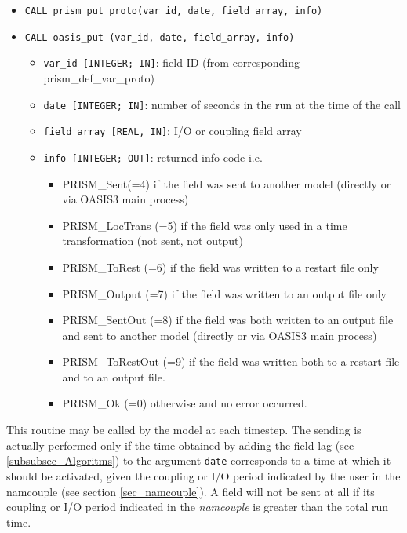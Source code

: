 \begin{itemize} 
 
\item {\tt CALL prism\_put\_proto(var\_id, date, field\_array, info)}
\item {\tt CALL oasis\_put       (var\_id, date, field\_array, info)}
\begin{itemize}
\item {\tt var\_id [INTEGER; IN]}: field ID (from
  corresponding prism\_def\_var\_proto)
\item {\tt date [INTEGER; IN]}: number of seconds in the run at the
time of the call
\item {\tt field\_array [REAL, IN]}: I/O or coupling field array 
\item {\tt info [INTEGER; OUT]}: returned info code i.e.
   \begin{itemize} 
      \item PRISM\_Sent(=4) if the field was sent to another model 
      (directly or via OASIS3 main process)
      \item PRISM\_LocTrans (=5) if the field was only used in a time
       transformation (not sent, not output)
      \item PRISM\_ToRest (=6) if the field was written to a restart file only
      \item PRISM\_Output (=7) if the field was written to an output file only
      \item PRISM\_SentOut (=8) if the field was both written to an output file
       and sent to another model (directly or via OASIS3 main process)
      \item PRISM\_ToRestOut (=9) if the field was written both to a
       restart file and to an output file.
      \item PRISM\_Ok (=0) otherwise and no error occurred.
   \end{itemize}
\end{itemize}
\end{itemize}

This routine may be called by the model at each timestep. The sending
is actually performed only if the time obtained by adding the field
lag (see \ref{subsubsec_Algoritms}) to the argument {\tt date}
corresponds to a time at which it should be activated, given the
coupling or I/O period indicated by the user in the namcouple (see
section \ref{sec_namcouple}). A field will not be sent at all if its
coupling or I/O period indicated in the {\it namcouple} is greater
than the total run time.

